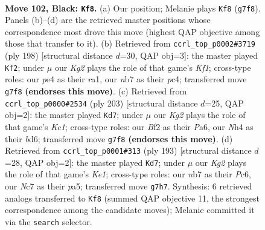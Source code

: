 \documentclass[11pt]{article}
\begin{document}
\clearpage

\begin{figure}[p]\centering
\begin{subfigure}{0.46\textwidth}\centering
\resizebox{\linewidth}{!}{%
\newchessgame
\chessboard[
  setfen={8/1Nn3k1/8/8/Pp2P2n/1B6/1K2pb1p/8 b - - 1 102},
  showmover=false,
  pgfstyle=straightmove, color=movearrow, markmove={g7-f8}
]}
\caption{}
\end{subfigure}\hfill
\begin{subfigure}{0.46\textwidth}\centering
\resizebox{\linewidth}{!}{%
\newchessgame
\chessboard[
  setfen={8/6k1/5p2/4pP2/2p3P1/2N5/3B4/r4K2 w - - 54 100},
  showmover=false,
  pgfstyle=straightmove, color=movearrow, markmove={f1-f2}
]}
\caption{}
\end{subfigure}
\\[4pt]
\begin{subfigure}{0.46\textwidth}\centering
\resizebox{\linewidth}{!}{%
\newchessgame
\chessboard[
  setfen={2k5/8/p1pBn1p1/8/P3P2P/5K2/1P6/8 b - - 4 102},
  showmover=false,
  pgfstyle=straightmove, color=movearrow, markmove={c8-d7}
]}
\caption{}
\end{subfigure}\hfill
\begin{subfigure}{0.46\textwidth}\centering
\resizebox{\linewidth}{!}{%
\newchessgame
\chessboard[
  setfen={4k3/8/p1p2p2/P3pP2/6K1/Bp6/1N1n4/8 b - - 5 97},
  showmover=false,
  pgfstyle=straightmove, color=movearrow, markmove={e8-d7}
]}
\caption{}
\end{subfigure}
\caption{\textbf{Move 102, Black: \texttt{Kf8}.} (a) Our position; Melanie plays \texttt{Kf8} (\texttt{g7f8}). Panels (b)--(d) are the retrieved master positions whose correspondence most drove this move (highest QAP objective among those that transfer to it). (b) Retrieved from \texttt{ccrl\_top\_p0002\#3719} (ply 198) [structural distance $d$=30, QAP obj=3]: the master played \texttt{Kf2}; under $\mu$ our \emph{Kg2} plays the role of that game's \emph{Kf1}; cross-type roles: our \emph{p}e4 as their \emph{r}a1, our \emph{n}b7 as their \emph{p}c4; transferred move \texttt{g7f8} \textbf{(endorses this move)}. (c) Retrieved from \texttt{ccrl\_top\_p0000\#2534} (ply 203) [structural distance $d$=25, QAP obj=2]: the master played \texttt{Kd7}; under $\mu$ our \emph{Kg2} plays the role of that game's \emph{Kc1}; cross-type roles: our \emph{B}f2 as their \emph{P}a6, our \emph{N}h4 as their \emph{b}d6; transferred move \texttt{g7f8} \textbf{(endorses this move)}. (d) Retrieved from \texttt{ccrl\_top\_p0001\#313} (ply 193) [structural distance $d$=28, QAP obj=2]: the master played \texttt{Kd7}; under $\mu$ our \emph{Kg2} plays the role of that game's \emph{Ke1}; cross-type roles: our \emph{n}b7 as their \emph{P}c6, our \emph{N}c7 as their \emph{p}a5; transferred move \texttt{g7h7}. Synthesis: 6 retrieved analogs transferred to \texttt{Kf8} (summed QAP objective 11, the strongest correspondence among the candidate moves); Melanie committed it via the \texttt{search} selector.}
\label{fig:thought-m203}
\end{figure}
\end{document}
